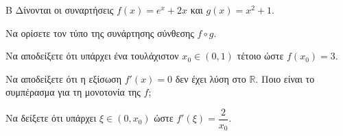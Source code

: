 \begin{thema}{Β}
Δίνονται οι συναρτήσεις $f(x) = e^x + 2x$ και $g(x) = x^2 + 1$.
\begin{erwthma}
\item Να ορίσετε τον τύπο της συνάρτησης σύνθεσης $f \circ g$.
\item Να αποδείξετε ότι υπάρχει ένα τουλάχιστον $x_0 \in (0, 1)$ τέτοιο ώστε $f(x_0) = 3$.
\item Να αποδείξετε ότι η εξίσωση $f'(x) = 0$ δεν έχει λύση στο $\mathbb{R}$. Ποιο είναι το συμπέρασμα για τη μονοτονία της $f$;
\item Να δείξετε ότι υπάρχει $\xi \in (0, x_0)$ ώστε $f'(\xi) = \dfrac{2}{x_0}$.
\end{erwthma}
\end{thema}
